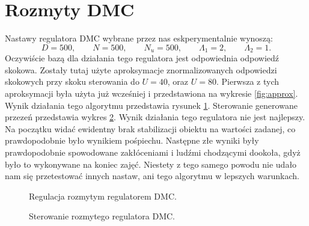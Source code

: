 \section{Rozmyty DMC}
Nastawy regulatora DMC wybrane przez nas eskperymentalnie wynoszą:
\begin{equation}
  D = 500, \qquad N = 500, \qquad N_u = 500, \qquad \Lambda_1 = 2, \qquad \Lambda_2 = 1.
\end{equation}
Oczywiście bazą dla działania tego regulatora jest odpowiednia odpowiedź skokowa.
Zostały tutaj użyte aproksymacje znormalizowanych odpowiedzi skokowych przy skoku
sterowania do $U = 40$, oraz $U = 80$. Pierwsza z tych aproksymacji była użyta już
wcześniej i przedstawiona na wykresie \ref{fig:approx}. Wynik działania tego
algorytmu przedstawia rysunek \ref{fig:z6_dmc}. Sterowanie generowane przezeń przedstawia
wykres \ref{fig:z6_dmc_u}. Wynik działania tego regulatora nie jest najlepszy.
Na początku widać ewidentny brak stabilizacji obiektu na wartości zadanej, co
prawdopodobnie było wynikiem pośpiechu. Następne złe wyniki były prawdopodobnie
spowodowane zakłóceniami i ludźmi chodzącymi dookoła, gdyż było to wykonywane
na koniec zajęć. Niestety z tego samego powodu nie udało nam się przetestować
innych nastaw, ani tego algorytmu w lepszych warunkach.


\begin{figure}[tb]
\centering
{}
\caption{Regulacja rozmytym regulatorem DMC.}
\label{fig:z6_dmc}
\end{figure}

\begin{figure}[tb]
\centering
{}
\caption{Sterowanie rozmytego regulatora DMC.}
\label{fig:z6_dmc_u}
\end{figure}
